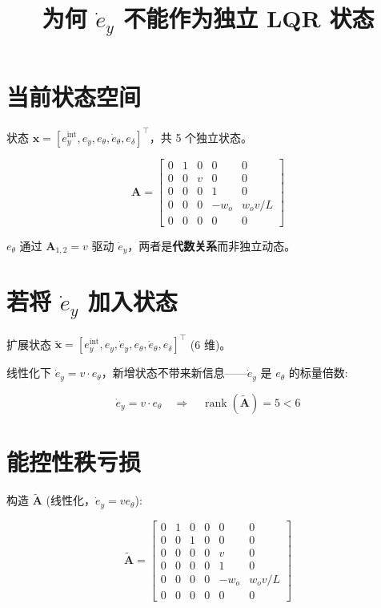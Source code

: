 \documentclass[11pt,a4paper]{article}
\title{为何 $\dot{e}_y$ 不能作为独立 LQR 状态}
\author{}
\date{}
\begin{document}
\maketitle

\section{当前状态空间}

状态 $\mathbf{x} = [e_y^{\text{int}}, e_y, e_\theta, \dot{e}_\theta, e_\delta]^\top$，共 5 个独立状态。

\begin{equation}
\mathbf{A} =
\begin{bmatrix}
0 & 1 & 0 & 0      & 0            \\
0 & 0 & v & 0      & 0            \\
0 & 0 & 0 & 1      & 0            \\
0 & 0 & 0 & -w_o   & w_o v/L \\
0 & 0 & 0 & 0      & 0
\end{bmatrix}
\end{equation}

$e_\theta$ 通过 $\mathbf{A}_{1,2} = v$ 驱动 $\dot{e}_y$，两者是\textbf{代数关系}而非独立动态。

\section{若将 $\dot{e}_y$ 加入状态}

扩展状态 $\tilde{\mathbf{x}} = [e_y^{\text{int}}, e_y, \dot{e}_y, e_\theta, \dot{e}_\theta, e_\delta]^\top$ (6 维)。

线性化下 $\dot{e}_y = v \cdot e_\theta$，新增状态不带来新信息——$\dot{e}_y$ 是 $e_\theta$ 的标量倍数:

\begin{equation}
\dot{e}_y = v \cdot e_\theta \quad\Rightarrow\quad \operatorname{rank}(\tilde{\mathbf{A}}) = 5 < 6
\end{equation}

\section{能控性秩亏损}

构造 $\tilde{\mathbf{A}}$ (线性化，$\dot{e}_y = v e_\theta$):

\begin{equation}
\tilde{\mathbf{A}} =
\begin{bmatrix}
0 & 1 & 0   & 0 & 0      & 0    \\
0 & 0 & 1   & 0 & 0      & 0    \\
0 & 0 & 0   & 0 & v      & 0    \\
0 & 0 & 0   & 0 & 1      & 0    \\
0 & 0 & 0   & 0 & -w_o   & w_o v/L \\
0 & 0 & 0   & 0 & 0      & 0
\end{bmatrix}
\end{equation}
\end{document}
